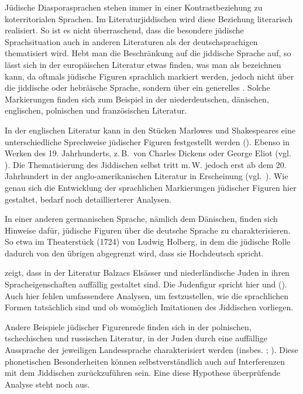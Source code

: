 Jüdische Diasporasprachen stehen immer in einer Kontrastbeziehung zu koterritorialen Sprachen. Im Literaturjiddischen wird diese Beziehung literarisch realisiert. So ist es nicht überraschend, dass die besondere jüdische Sprachsituation auch in anderen Literaturen als der deutschsprachigen thematisiert wird. Hebt man die Beschränkung auf die jiddische Sprache auf, so lässt sich in der europäischen Literatur etwas finden, was man als  bezeichnen kann, da oftmals jüdische Figuren sprachlich markiert werden, jedoch nicht über die jiddische oder hebräische Sprache, sondern über ein generelles . Solche Markierungen finden sich zum Beispiel in der
niederdeutschen,
dänischen,
englischen, 
polnischen  und 
französischen  Literatur. %

In der englischen Literatur kann in den Stücken Marlowes und Shakespeares eine unterschiedliche Sprechweise jüdischer Figuren festgestellt werden (\citealt[193]{Groezinger1998}). Ebenso in Werken des 19. Jahrhunderts, z.\,B.\, von Charles Dickens oder George Eliot (vgl.\, \citealt[193]{Groezinger1998}). Die Thematisierung des Jiddischen selbst tritt m.\,W. jedoch erst ab dem 20. Jahrhundert in der anglo-amerikanischen Literatur in Erscheinung (vgl.\, \citealt{Fischer2003}). Wie genau sich die Entwicklung der sprachlichen Markierungen jüdischer Figuren hier gestaltet, bedarf noch detaillierterer Analysen.

In einer anderen germanischen Sprache, nämlich dem Dänischen, finden sich Hinweise dafür, jüdische Figuren über die deutsche Sprache zu charakterisieren. So etwa im  Theaterstück  (1724) von Ludwig Holberg, in dem die jüdische Rolle dadurch von den übrigen abgegrenzt wird, dass sie Hochdeutsch spricht.

\largerpage
\cite[60]{Hausmann1989} zeigt, dass in der Literatur Balzacs Elsässer und niederländische Juden in ihren Spracheigenschaften auffällig gestaltet sind. Die Judenfigur spricht hier  und  (\citealt[194]{Groezinger1998}). Auch hier fehlen umfassendere Analysen, um festzustellen, wie  die sprachlichen Formen tatsächlich sind und ob womöglich Imitationen des Jiddischen vorliegen.

Andere Beispiele jüdischer Figurenrede finden sich in der polnischen, tschechischen und russischen Literatur, in der Juden durch eine auffällige Aussprache der jeweiligen Landessprache charakterisiert werden (insbes. \citealt{Brzezina1986,Berger1999,Kosta1999,Dohrn1999}; \citealt[194–196]{Groezinger1998}). Diese phonetischen Besonderheiten können selbstverständlich auch auf Interferenzen mit dem Jiddischen zurückzuführen sein. Eine diese Hypothese überprüfende Analyse steht noch aus. 

